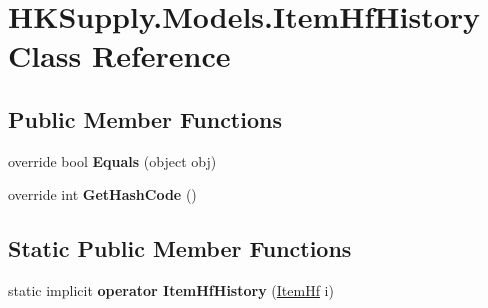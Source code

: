 \hypertarget{class_h_k_supply_1_1_models_1_1_item_hf_history}{}\section{H\+K\+Supply.\+Models.\+Item\+Hf\+History Class Reference}
\label{class_h_k_supply_1_1_models_1_1_item_hf_history}
\subsection*{Public Member Functions}
\begin{DoxyCompactItemize}
\item 
\mbox{\label{class_h_k_supply_1_1_models_1_1_item_hf_history_a4f489754efb72e5467b5a72784a930cc}} 
override bool {\bfseries Equals} (object obj)
\item 
\mbox{\label{class_h_k_supply_1_1_models_1_1_item_hf_history_a6129a7e3b222275676066068c72b892a}} 
override int {\bfseries Get\+Hash\+Code} ()
\end{DoxyCompactItemize}
\subsection*{Static Public Member Functions}
\begin{DoxyCompactItemize}
\item 
\mbox{\label{class_h_k_supply_1_1_models_1_1_item_hf_history_a20fc43c835c3eaf231735e41f15c169b}} 
static implicit {\bfseries operator Item\+Hf\+History} (\mbox{\hyperlink{class_h_k_supply_1_1_models_1_1_item_hf}{Item\+Hf}} i)
\end{DoxyCompactItemize}
